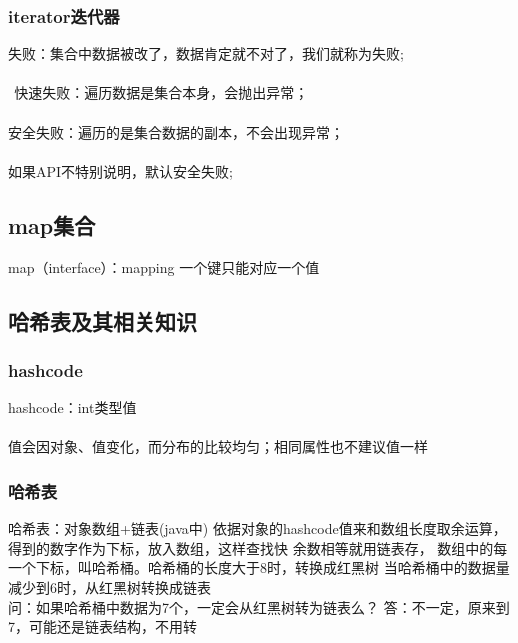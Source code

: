 \documentclass[12pt]{ctexart}
\begin{document}
\subsubsection{iterator迭代器}
失败：集合中数据被改了，数据肯定就不对了，我们就称为失败;\paragraph{}
$\ \ $快速失败：遍历数据是集合本身，会抛出异常；\paragraph{}
\quad 安全失败：遍历的是集合数据的副本，不会出现异常；\paragraph{}
\quad 如果API不特别说明，默认安全失败;\paragraph{}
\subsection{map集合}
map（interface）：mapping
一个键只能对应一个值
\subsection{哈希表及其相关知识}
\subsubsection{hashcode}
hashcode：int类型值\paragraph{}
值会因对象、值变化，而分布的比较均匀；相同属性也不建议值一样
\subsubsection{哈希表}
哈希表：对象数组+链表(java中)
依据对象的hashcode值来和数组长度取余运算，得到的数字作为下标，放入数组，这样查找快
余数相等就用链表存，
数组中的每一个下标，叫哈希桶。哈希桶的长度大于8时，转换成红黑树
当哈希桶中的数据量减少到6时，从红黑树转换成链表
\\
问：如果哈希桶中数据为7个，一定会从红黑树转为链表么？
答：不一定，原来到7，可能还是链表结构，不用转
\end{document}

